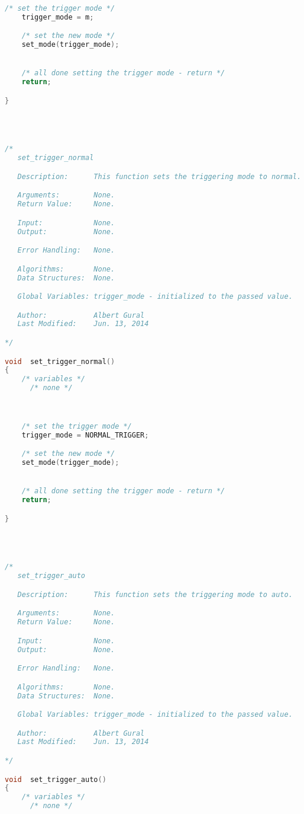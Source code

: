 \begin{lstlisting}[language=C]
    /* set the trigger mode */
    trigger_mode = m;

    /* set the new mode */
    set_mode(trigger_mode);


    /* all done setting the trigger mode - return */
    return;

}




/*
   set_trigger_normal

   Description:      This function sets the triggering mode to normal.

   Arguments:        None.
   Return Value:     None.

   Input:            None.
   Output:           None.

   Error Handling:   None.

   Algorithms:       None.
   Data Structures:  None.

   Global Variables: trigger_mode - initialized to the passed value.

   Author:           Albert Gural
   Last Modified:    Jun. 13, 2014

*/

void  set_trigger_normal()
{
    /* variables */
      /* none */



    /* set the trigger mode */
    trigger_mode = NORMAL_TRIGGER;

    /* set the new mode */
    set_mode(trigger_mode);


    /* all done setting the trigger mode - return */
    return;

}




/*
   set_trigger_auto

   Description:      This function sets the triggering mode to auto.

   Arguments:        None.
   Return Value:     None.

   Input:            None.
   Output:           None.

   Error Handling:   None.

   Algorithms:       None.
   Data Structures:  None.

   Global Variables: trigger_mode - initialized to the passed value.

   Author:           Albert Gural
   Last Modified:    Jun. 13, 2014

*/

void  set_trigger_auto()
{
    /* variables */
      /* none */




\end{lstlisting}
